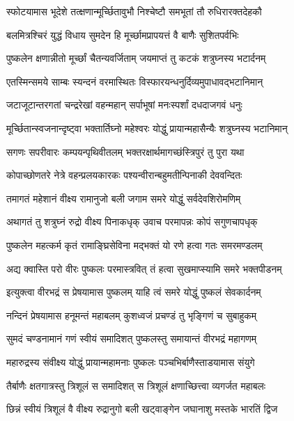 \twolineshloka
{स्फोटयामास भूदेशे तत्क्षणान्मूर्च्छितावुभौ}
{निश्चेष्टौ समभूतां तौ रुधिरारक्तदेहकौ}%

\twolineshloka
{बलमित्रश्चिरं युद्धं विधाय सुमदेन हि}
{मूर्च्छामप्रापयत्तं वै बाणैः सुशितपर्वभिः}%

\twolineshloka
{पुष्कलेन क्षणान्नीतो मूर्च्छां चैतन्यवर्जिताम्}
{जयमाप्तं तु कटकं शत्रुघ्नस्य भटार्दनम्}%

\twolineshloka
{एतस्मिन्समये साम्बः स्यन्दनं वरमास्थितः}
{विस्फारयन्धनुर्दिव्यमुपाधावद्भटानिमान्}%

\twolineshloka
{जटाजूटान्तरगतां चन्द्ररेखां वहन्महान्}
{सर्पाभूषां मनःस्पर्शां दधदाजगवं धनुः}%

\twolineshloka
{मूर्च्छितान्स्वजनान्दृष्ट्वा भक्तार्तिघ्नो महेश्वरः}
{योद्धुं प्रायान्महासैन्यैः शत्रुघ्नस्य भटानिमान्}%

\twolineshloka
{सगणः सपरीवारः कम्पयन्पृथिवीतलम्}
{भक्तरक्षार्थमागच्छंस्त्रिपुरं तु पुरा यथा}%

\twolineshloka
{कोपाच्छोणतरे नेत्रे वहन्प्रलयकारकः}
{पश्यन्वीरान्बहुमतीन्पिनाकी देववन्दितः}%

\twolineshloka
{तमागतं महेशानं वीक्ष्य रामानुजो बली}
{जगाम समरे योद्धुं सर्वदेवशिरोमणिम्}%

\twolineshloka
{अथागतं तु शत्रुघ्नं रुद्रो वीक्ष्य पिनाकधृक्}
{उवाच परमापन्नः कोपं सगुणचापधृक्}%

\twolineshloka
{पुष्कलेन महत्कर्म कृतं रामाङ्घ्रिसेविना}
{मद्भक्तं यो रणे हत्वा गतः समरमण्डलम्}%

\twolineshloka
{अद्य क्वास्ति परो वीरः पुष्कलः परमास्त्रवित्}
{तं हत्वा सुखमाप्स्यामि समरे भक्तपीडनम्}%


\twolineshloka
{इत्युक्त्वा वीरभद्रं स प्रेषयामास पुष्कलम्}
{याहि त्वं समरे योद्धुं पुष्कलं सेवकार्दनम्}%

\twolineshloka
{नन्दिनं प्रेषयामास हनूमन्तं महाबलम्}
{कुशध्वजं प्रचण्डं तु भृङ्गिणं च सुबाहुकम्}%

\twolineshloka
{सुमदं चण्डनामानं गणं स्वीयं समादिशत्}
{पुष्कलस्तु समायान्तं वीरभद्रं महागणम्}%

\twolineshloka
{महारुद्रस्य संवीक्ष्य योद्धुं प्रायान्महामनाः}
{पुष्कलः पञ्चभिर्बाणैस्ताडयामास संयुगे}%

\twolineshloka
{तैर्बाणैः क्षतगात्रस्तु त्रिशूलं स समादिशत्}
{स त्रिशूलं क्षणाच्छित्त्वा व्यगर्जत महाबलः}%

\twolineshloka
{छिन्नं स्वीयं त्रिशूलं वै वीक्ष्य रुद्रानुगो बली}
{खट्वाङ्गेन जघानाशु मस्तके भारतिं द्विज}%

